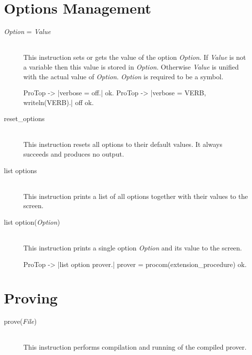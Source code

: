 \section{Options Management}

\begin{description}
  \item [{\em Option} = {\em Value}]\ \\
  This instruction sets or gets the value of the option {\em Option}. If {\em
  Value} is not a variable then this value is stored in {\em Option}.
  Otherwise {\em Value}\/ is unified with the actual value of {\em Option}.
  {\em Option} is required to be a symbol.

\begin{BoxedSample}
  ProTop -> |verbose = off.|
  ok.
  ProTop -> |verbose = VERB, writeln(VERB).|
  off
  ok.
\end{BoxedSample}

  \item [reset\_options]\ \\
  This instruction resets all options to their default values. It always
  succeeds and produces no output.

  \item [list options]\ \\
  This instruction prints a list of all options together with their values to
  the screen.

  \item [list option({\em Option})]\ \\
  This instruction prints a single option {\em Option}\/ and its value to the
  screen.
\begin{BoxedSample}
  ProTop -> |list option prover.|
         prover = procom(extension\_procedure)
  ok.
\end{BoxedSample}

\end{description}

\section{Proving}

\begin{description}

  \item [prove({\em File})]\ \\
  This instruction performs compilation and running of the compiled prover.
\end{description}


